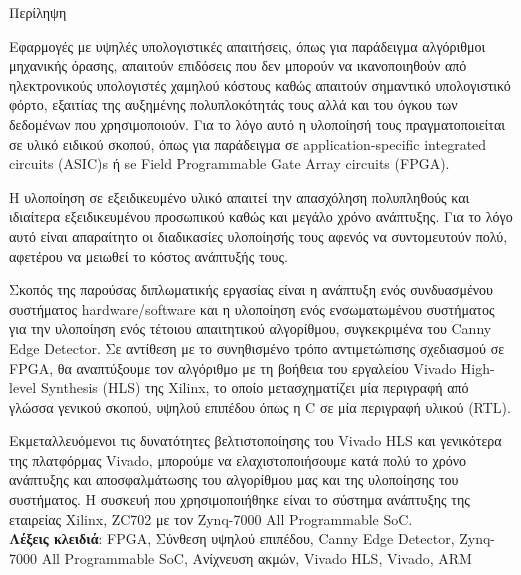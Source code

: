 \pagestyle{plain}

\begin{center}
{\LARGE Περίληψη}\\[1cm]
\end{center}

Εφαρμογές με υψηλές υπολογιστικές απαιτήσεις, όπως για παράδειγμα αλγόριθμοι μηχανικής όρασης, απαιτούν επιδόσεις που δεν μπορούν να ικανοποιηθούν από ηλεκτρονικούς υπολογιστές χαμηλού κόστους καθώς απαιτούν σημαντικό υπολογιστικό φόρτο, εξαιτίας της αυξημένης πολυπλοκότητάς τους αλλά και του όγκου των δεδομένων που χρησιμοποιούν. Για το λόγο αυτό η υλοποίησή τους πραγματοποιείται σε υλικό ειδικού σκοπού, όπως για παράδειγμα σε application-specific integrated circuits (ASIC)s ή se Field Programmable Gate Array circuits (FPGA).

Η υλοποίηση σε εξειδικευμένο υλικό απαιτεί την απασχόληση πολυπληθούς και ιδιαίτερα εξειδικευμένου προσωπικού καθώς και μεγάλο χρόνο ανάπτυξης. Για το λόγο αυτό είναι απαραίτητο οι διαδικασίες υλοποίησής τους αφενός να συντομευτούν πολύ, αφετέρου να μειωθεί το κόστος ανάπτυξής τους.

Σκοπός της παρούσας διπλωματικής εργασίας είναι η ανάπτυξη ενός συνδυασμένου συστήματος hardware/software και η υλοποίηση ενός ενσωματωμένου συστήματος για την υλοποίηση ενός τέτοιου απαιτητικού αλγορίθμου, συγκεκριμένα του Canny Edge Detector. Σε αντίθεση με το συνηθισμένο τρόπο αντιμετώπισης σχεδιασμού σε FPGA, θα αναπτύξουμε τον αλγόριθμο με τη βοήθεια του εργαλείου Vivado High-level Synthesis (HLS) της Xilinx, το οποίο μετασχηματίζει μία περιγραφή από γλώσσα γενικού σκοπού, υψηλού επιπέδου όπως η C σε μία περιγραφή υλικού (RTL).


Εκμεταλλευόμενοι τις δυνατότητες βελτιστοποίησης του Vivado HLS και γενικότερα της πλατφόρμας Vivado, μπορούμε να ελαχιστοποιήσουμε κατά πολύ το χρόνο ανάπτυξης και αποσφαλμάτωσης του αλγορίθμου μας και της υλοποίησης του συστήματος. Η συσκευή που χρησιμοποιήθηκε είναι το σύστημα ανάπτυξης της εταιρείας Xilinx, ZC702 με τον Zynq-7000 All Programmable SoC.\\

\noindent
\textbf{Λέξεις κλειδιά}: FPGA, Σύνθεση υψηλού επιπέδου, Canny Edge Detector, Zynq-7000 All Programmable SoC, Ανίχνευση ακμών,  Vivado HLS, Vivado, ARM